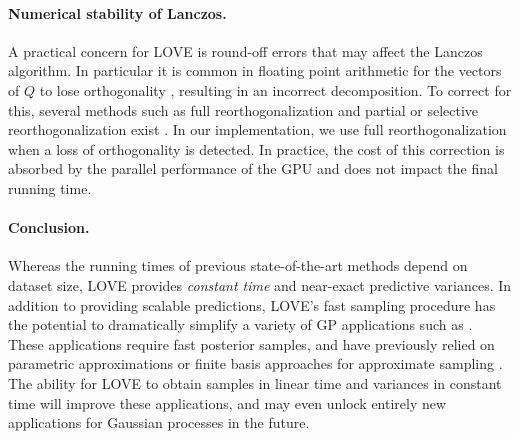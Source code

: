 \paragraph{Numerical stability of Lanczos.}
A practical concern for LOVE{} is round-off errors that may affect the Lanczos algorithm.
In particular it is common in floating point arithmetic for the vectors of $Q$ to lose orthogonality \cite{paige1970practical,simon1984lanczos,golub2012matrix}, resulting in an incorrect decomposition.
To correct for this, several methods such as full reorthogonalization and partial or selective reorthogonalization exist \cite{golub2012matrix}.
In our implementation, we use full reorthogonalization when a loss of orthogonality is detected.
In practice, the cost of this correction is absorbed by the parallel performance of the GPU and does not impact the final running time.

\paragraph{Conclusion.}
Whereas the running times of previous state-of-the-art methods depend on dataset size, LOVE{} provides \emph{constant time} and near-exact predictive variances.
In addition to providing scalable predictions, LOVE{}'s fast sampling procedure has the potential to dramatically simplify a variety of GP applications such as \citep[e.g.,][]{deisenroth2011pilco,hernandez2014predictive,wang2017max}.
These applications require fast posterior samples, and have previously relied on parametric approximations or finite basis approaches for approximate sampling \citep[e.g.,][]{deisenroth2011pilco,wang2017max}.
The ability for LOVE{} to obtain samples in linear time and variances in constant time will improve these applications, and may even unlock entirely new applications for Gaussian processes in the future.
